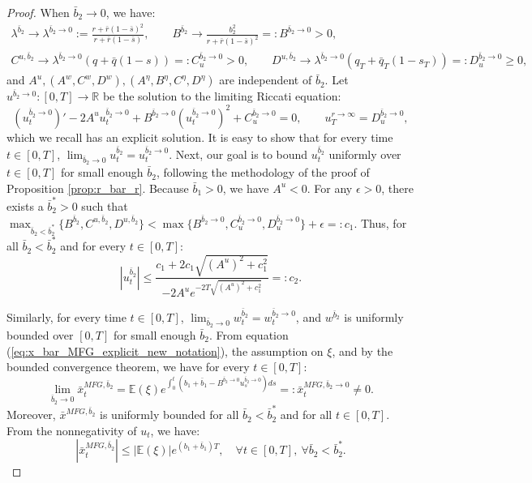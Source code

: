 \documentclass[11pt]{article}
\begin{document}
\begin{proof}
	When $\bar{b}_2 \to 0$, we have:
	\begin{equation*}
	\begin{array}{l}
		 \lambda^{\bar{b}_2} \to \lambda^{\bar{b}_2 \to 0} := \frac{r + \bar{r}(1- \bar{s})^2}{r + \bar{r}(1-\bar{s})}, \qquad 
		 B^{\bar{b}_2} \to \frac{b_2^2}{r + \bar{r}(1-\bar{s})^2}=:B^{\bar{b}_2 \to 0} > 0,\\
		 C^{u,\bar{b}_2} \to \lambda^{\bar{b}_2 \to 0}(q+\bar{q}(1-s))=:C^{\bar{b}_2 \to 0}_u >0,\qquad 
		 D^{u,\bar{b}_2} \to \lambda^{\bar{b}_2 \to 0}(q_T+\bar{q}_T(1-s_T))=:D^{\bar{b}_2 \to 0}_u \geq 0,
	\end{array}
	\end{equation*}
	and $A^u, (A^w, C^w, D^w), (A^\eta, B^\eta, C^\eta, D^\eta)$ are independent of $\bar{b}_2$.	
	Let $u^{\bar{b}_2 \to 0}:[0,T]\to \mathbb{R}$ be the solution to the limiting Riccati equation:
	\begin{equation}
	\left({u}^{{\bar{b}_2 \to 0}}_t\right)' - 2A^u u_t^{\bar{b}_2 \to 0} +B^{\bar{b}_2 \to 0} (u_t^{\bar{b}_2 \to 0})^2+ C^{\bar{b}_2 \to 0}_u = 0, \qquad u_T^{r \to \infty} = D^{\bar{b}_2 \to 0}_u,
	\end{equation}
	which we recall has an explicit solution. It is easy to show that for every time $t\in [0,T]$, $\lim_{\bar{b}_2 \to 0}u^{\bar{b}_2}_t=u^{\bar{b}_2 \to 0}_t$. Next, our goal is to bound $u^{\bar{b}_2}_t$ uniformly over $t \in [0,T]$ for small enough $\bar{b}_2$, following the methodology of the proof of Proposition \ref{prop:r_bar_r}. Because $\bar{b}_1 > 0$, we have $A^u < 0$. For any $\epsilon>0$, there exists a $\bar{b}^*_2>0$ such that $\max_{\bar{b}_2<\bar{b}^*_2} \{ B^{\bar{b}_2},C^{u,\bar{b}_2},D^{u,\bar{b}_2} \}<\max \{B^{\bar{b}_2 \to 0},C^{\bar{b}_2 \to 0}_u,D^{\bar{b}_2 \to 0}_u \}+\epsilon=:c_1$. Thus, for all $\bar{b}_2<\bar{b}^*_2$ and for every $t \in [0,T]$:
	\begin{equation*}
		\left \vert u_t^{\bar{b}_2} \right\vert \leq \frac{c_1 + 2 c_1 \sqrt{(A^u)^2 + c_1^2}}{-2A^u e^{-2T \sqrt{(A^u)^2 + c_1^2}}} =:c_2.
	\end{equation*}
	
	Similarly, for every time $t\in [0,T]$, $\lim_{\bar{b}_2 \to 0}w^{\bar{b}_2}_t=w^{\bar{b}_2 \to 0}_t$, and  $w^{\bar{b}_2}$ is uniformly bounded over $[0,T]$ for small enough $\bar{b}_2$. From equation (\ref{eq:x_bar_MFG_explicit_new_notation}), the assumption on $\xi$, and by the bounded convergence theorem, we have for every $t \in [0,T]$:
   	$$\lim_{\bar{b}_2 \to 0} \bar{x}_t^{MFG,\bar{b}_2} = \mathbb{E}(\xi) e^{\int_0^t (b_1 + \bar{b}_1 - B^{\bar{b}_2 \to 0}u^{\bar{b}_2 \to 0}_s) ds} =: \bar{x}^{MFG,\bar{b}_2 \to 0}_t\neq 0.$$
	Moreover, $\bar{x}^{MFG,\bar{b}_2}$ is uniformly bounded for all $\bar{b}_2<\bar{b}^*_2$ and for all $t \in [0,T]$. From the nonnegativity of $u_t$, we have:
	$$ \left\vert \bar{x}^{MFG,\bar{b}_2}_t \right\vert \leq \left\vert \mathbb{E}(\xi) \right\vert e^{ (b_1 + \bar{b}_1 ) T }, \quad \forall t \in [0,T], \ \forall \bar{b}_2<\bar{b}^*_2. $$ 
   	

\end{proof}
\end{document}

